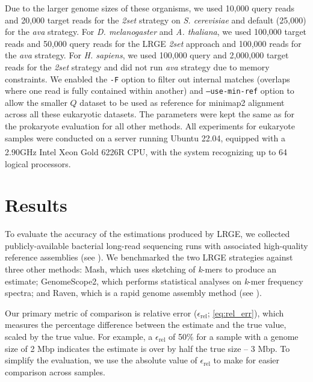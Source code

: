 \documentclass[unnumsec,webpdf,modern,large]{oup-authoring-template}
\theoremstyle{thmstyleone}%
\theoremstyle{thmstyletwo}%
\theoremstyle{thmstylethree}%
\newcommand{\lrge}{LRGE}
\newcommand{\relerr}{$\epsilon_{\text{rel}}$}
\newcommand{\ava}{\textit{ava}}
\newcommand{\twoset}{\textit{2set}}
\newcommand{\kmer}{\textit{k}-mer}
\begin{document}
Due to the larger genome sizes of these organisms, we used 10,000 query reads and 20,000 target reads for the \twoset{} strategy on \textit{S. cerevisiae} and default (25,000) for the \ava{} strategy. For \textit{D. melanogaster} and \textit{A. thaliana}, we used 100,000 target reads and 50,000 query reads for the \lrge{} \twoset{} approach and 100,000 reads for the \ava{} strategy. For \textit{H. sapiens}, we used 100,000 query and 2,000,000 target reads for the \twoset{} strategy and did not run \ava{} strategy due to memory constraints. We enabled the \texttt{-F} option to filter out internal matches (overlaps where one read is fully contained within another) and \texttt{--use-min-ref} option to allow the smaller $Q$ dataset to be used as reference for minimap2 alignment across all these eukaryotic datasets. The parameters were kept the same as for the prokaryote evaluation for all other methods. All experiments for eukaryote samples were conducted on a server running Ubuntu 22.04, equipped with a 2.90GHz Intel\textsuperscript{\tiny{\textregistered}} Xeon\textsuperscript{\tiny{\textregistered}} Gold 6226R CPU, with the system recognizing up to 64 logical processors.


\section{Results}

To evaluate the accuracy of the estimations produced by \lrge{}, we collected publicly-available bacterial long-read sequencing runs with associated high-quality reference assemblies (see ). We benchmarked the two \lrge{} strategies against three other methods: Mash, which uses sketching of \kmer{}s to produce an estimate; GenomeScope2, which performs statistical analyses on \kmer{} frequency spectra; and Raven, which is a rapid genome assembly method (see ).

Our primary metric of comparison is relative error (\relerr{}; \autoref{eq:rel_err}), which measures the percentage difference between the estimate and the true value, scaled by the true value. For example, a \relerr{} of 50\% for a sample with a genome size of 2 Mbp indicates the estimate is over by half the true size -- 3 Mbp. To simplify the evaluation, we use the absolute value of \relerr{} to make for easier comparison across samples.
\end{document}
